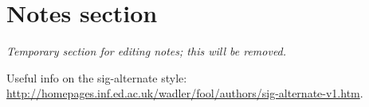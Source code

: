 \section{Notes section}

\emph{Temporary section for editing notes; this will be removed.}

Useful info on the sig-alternate style: \\
\url{http://homepages.inf.ed.ac.uk/wadler/fool/authors/sig-alternate-v1.htm}.
